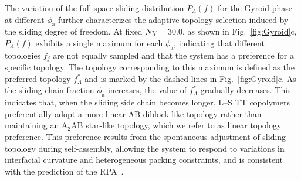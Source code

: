 The variation of the full-space sliding distribution $P_\Lambda(f)$ for the Gyroid phase at different $\phi_{\mathrm a}$ further characterizes the adaptive topology selection induced by the sliding degree of freedom.
At fixed $N\chi=30.0$, as shown in Fig.~\ref{fig:Gyroid}c, $P_\Lambda(f)$ exhibits a single maximum for each $\phi_{\mathrm a}$, indicating that different topologies $f_j$ are not equally sampled and that the system has a preference for a specific topology.
The topology corresponding to this maximum is defined as the preferred topology $f_\Lambda^\ast$ and is marked by the dashed lines in Fig.~\ref{fig:Gyroid}c.
As the sliding chain fraction $\phi_{\mathrm a}$ increases, the value of $f_\Lambda^\ast$ gradually decreases.
This indicates that, when the sliding side chain becomes longer, L--S TT copolymers preferentially adopt a more linear AB-diblock-like topology rather than maintaining an $\mathrm{A_2AB}$ star-like topology, which we refer to as linear topology preference.
This preference results from the spontaneous adjustment of sliding topology during self-assembly, allowing the system to respond to variations in interfacial curvature and heterogeneous packing constraints, and is consistent with the prediction of the RPA~\cite{Zhao2024Phase}.
